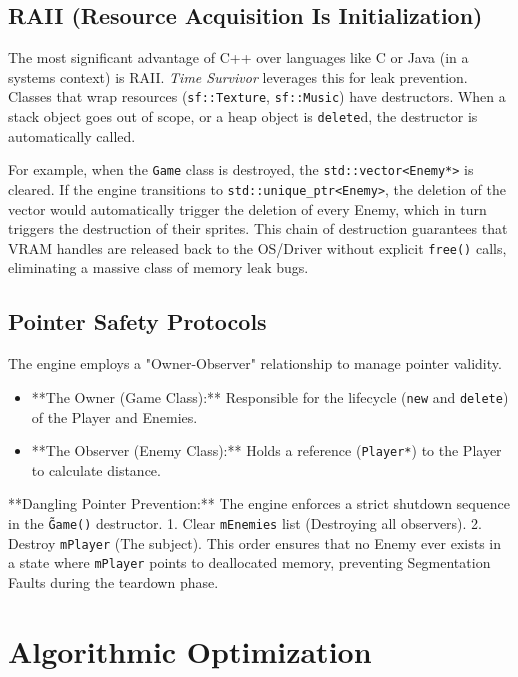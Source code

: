 \documentclass[10pt, a4paper]{article}
\begin{document}
\subsection{RAII (Resource Acquisition Is Initialization)}
The most significant advantage of C++ over languages like C or Java (in a systems context) is RAII. \textit{Time Survivor} leverages this for leak prevention.
Classes that wrap resources (\texttt{sf::Texture}, \texttt{sf::Music}) have destructors. When a stack object goes out of scope, or a heap object is \texttt{delete}d, the destructor is automatically called. 

For example, when the \texttt{Game} class is destroyed, the \texttt{std::vector<Enemy*>} is cleared. If the engine transitions to \texttt{std::unique\_ptr<Enemy>}, the deletion of the vector would automatically trigger the deletion of every Enemy, which in turn triggers the destruction of their sprites. This chain of destruction guarantees that VRAM handles are released back to the OS/Driver without explicit \texttt{free()} calls, eliminating a massive class of memory leak bugs.

\subsection{Pointer Safety Protocols}
The engine employs a "Owner-Observer" relationship to manage pointer validity.
\begin{itemize}
    \item **The Owner (Game Class):** Responsible for the lifecycle (\texttt{new} and \texttt{delete}) of the Player and Enemies.
    \item **The Observer (Enemy Class):** Holds a reference (\texttt{Player*}) to the Player to calculate distance.
\end{itemize}

**Dangling Pointer Prevention:**
The engine enforces a strict shutdown sequence in the \texttt{\~Game()} destructor.
1. Clear \texttt{mEnemies} list (Destroying all observers).
2. Destroy \texttt{mPlayer} (The subject).
This order ensures that no Enemy ever exists in a state where \texttt{mPlayer} points to deallocated memory, preventing Segmentation Faults during the teardown phase.

\newpage

\section{Algorithmic Optimization}
\end{document}
